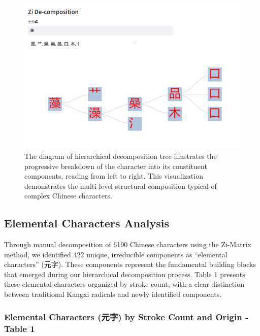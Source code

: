 \begin{figure}
\centering
\includegraphics{./images/app_decomposing-zi.png}
\caption{The diagram of hierarchical decomposition tree illustrates the
progressive breakdown of the character into its constituent components,
reading from left to right. This visualization demonstrates the
multi-level structural composition typical of complex Chinese
characters.}
\end{figure}

\subsection{Elemental Characters
Analysis}\label{elemental-characters-analysis}

Through manual decomposition of 6190 Chinese characters using the
Zi-Matrix method, we identified 422 unique, irreducible components as
``elemental characters'' (元字). These components represent the
fundamental building blocks that emerged during our hierarchical
decomposition process. Table 1 presents these elemental characters
organized by stroke count, with a clear distinction between traditional
Kangxi radicals and newly identified components.

\subsubsection{Elemental Characters (元字) by Stroke Count and Origin -
Table
1}\label{elemental-characters-ux5143ux5b57-by-stroke-count-and-origin---table-1}


